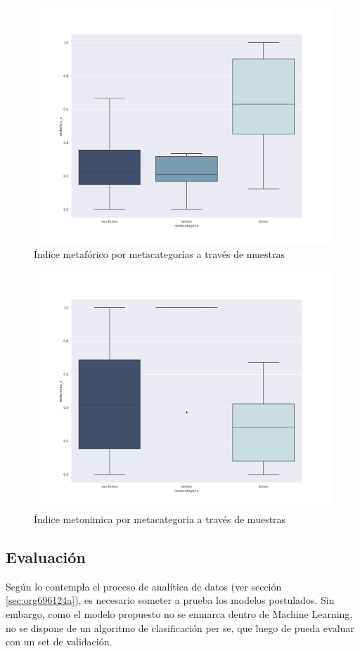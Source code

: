 \documentclass[12pt,letterpaper,twoside]{article}
\begin{document}
\begin{figure}[H]
\centering
\includegraphics[width=0.9\linewidth]{./resultados/graphs/total/metafora_total.png}
\caption{\label{fig:metafora_total} Índice metafórico por metacategorías a través de muestras }
\end{figure}

\begin{figure}[H]
\centering
\includegraphics[width=0.9\linewidth]{./resultados/graphs/total/metonimia_total.png}
\caption{\label{fig:metonimia_total} Índice metonimica por metacategoria a través de muestras }
\end{figure}

\subsection{Evaluación}
\label{sec:org38bfd3e}
Según lo contempla el proceso de analítica de datos (ver sección \ref{sec:org696124a}),
es necesario someter a prueba los modelos postulados. Sin embargo, como el modelo propuesto
no se enmarca dentro de Machine Learning, no se dispone de un algoritmo de clasificación
per se, que luego de pueda evaluar con un set de validación.
\end{document}
